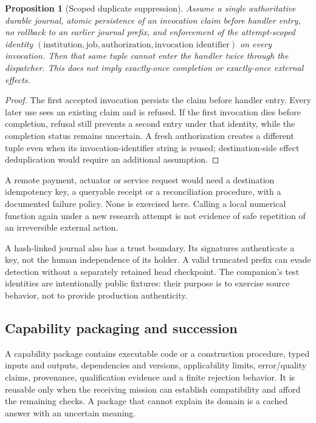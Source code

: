 \documentclass[11pt]{article}
\newtheorem{proposition}{Proposition}
\begin{document}
\begin{proposition}[Scoped duplicate suppression]
Assume a single authoritative durable journal, atomic persistence of an invocation claim before handler entry, no rollback to an earlier journal prefix, and enforcement of the attempt-scoped identity $(\text{institution},\text{job},\text{authorization},\text{invocation identifier})$ on every invocation. Then that same tuple cannot enter the handler twice through the dispatcher. This does not imply exactly-once completion or exactly-once external effects.
\end{proposition}
\begin{proof}
The first accepted invocation persists the claim before handler entry. Every later use sees an existing claim and is refused. If the first invocation dies before completion, refusal still prevents a second entry under that identity, while the completion status remains uncertain. A fresh authorization creates a different tuple even when its invocation-identifier string is reused; destination-side effect deduplication would require an additional assumption.
\end{proof}

A remote payment, actuator or service request would need a destination idempotency key, a queryable receipt or a reconciliation procedure, with a documented failure policy. None is exercised here. Calling a local numerical function again under a new research attempt is not evidence of safe repetition of an irreversible external action.

A hash-linked journal also has a trust boundary. Its signatures authenticate a key, not the human independence of its holder. A valid truncated prefix can evade detection without a separately retained head checkpoint. The companion's test identities are intentionally public fixtures: their purpose is to exercise source behavior, not to provide production authenticity.

\subsection{Capability packaging and succession}

A capability package contains executable code or a construction procedure, typed inputs and outputs, dependencies and versions, applicability limits, error/quality claims, provenance, qualification evidence and a finite rejection behavior. It is reusable only when the receiving mission can establish compatibility and afford the remaining checks. A package that cannot explain its domain is a cached answer with an uncertain meaning.
\end{document}
